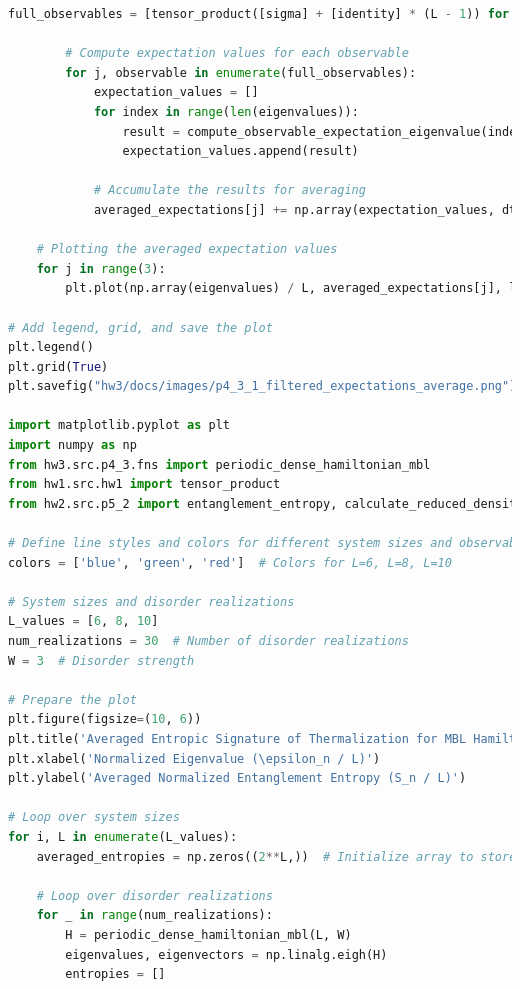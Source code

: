 \documentclass[12pt]{article}
\begin{document}
\begin{lstlisting}[language=Python]
        full_observables = [tensor_product([sigma] + [identity] * (L - 1)) for sigma in [sigma_x, sigma_y, sigma_z]]

        # Compute expectation values for each observable
        for j, observable in enumerate(full_observables):
            expectation_values = []
            for index in range(len(eigenvalues)):
                result = compute_observable_expectation_eigenvalue(index, observable, eigenvectors)
                expectation_values.append(result)

            # Accumulate the results for averaging
            averaged_expectations[j] += np.array(expectation_values, dtype=np.float64) / num_realizations

    # Plotting the averaged expectation values
    for j in range(3):
        plt.plot(np.array(eigenvalues) / L, averaged_expectations[j], label=f'L={L}, $\\sigma_{{1}}^{{{observable_labels[j]}}}$', color=colors[j], linestyle=line_styles[i])

# Add legend, grid, and save the plot
plt.legend()
plt.grid(True)
plt.savefig("hw3/docs/images/p4_3_1_filtered_expectations_average.png")

import matplotlib.pyplot as plt
import numpy as np
from hw3.src.p4_3.fns import periodic_dense_hamiltonian_mbl
from hw1.src.hw1 import tensor_product
from hw2.src.p5_2 import entanglement_entropy, calculate_reduced_density_matrix

# Define line styles and colors for different system sizes and observables
colors = ['blue', 'green', 'red']  # Colors for L=6, L=8, L=10

# System sizes and disorder realizations
L_values = [6, 8, 10]
num_realizations = 30  # Number of disorder realizations
W = 3  # Disorder strength

# Prepare the plot
plt.figure(figsize=(10, 6))
plt.title('Averaged Entropic Signature of Thermalization for MBL Hamiltonian')
plt.xlabel('Normalized Eigenvalue (\epsilon_n / L)')
plt.ylabel('Averaged Normalized Entanglement Entropy (S_n / L)')

# Loop over system sizes
for i, L in enumerate(L_values):
    averaged_entropies = np.zeros((2**L,))  # Initialize array to store averaged entropies

    # Loop over disorder realizations
    for _ in range(num_realizations):
        H = periodic_dense_hamiltonian_mbl(L, W)
        eigenvalues, eigenvectors = np.linalg.eigh(H)
        entropies = []


\end{lstlisting}
\end{document}
